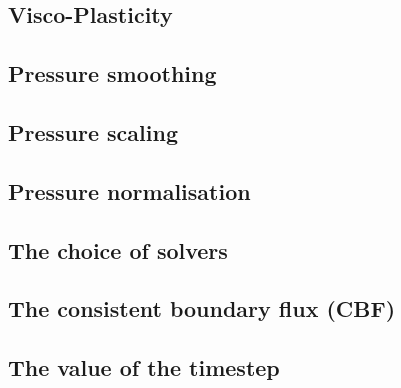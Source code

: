 \documentclass[a4paper]{article}
\begin{document}
\newpage %
\subsection{Visco-Plasticity}  %

\newpage %
\subsection{Pressure smoothing}  %

\newpage %
\subsection{Pressure scaling}  %

\newpage %
\subsection{Pressure normalisation}  %

\newpage %
\subsection{The choice of solvers\label{sec_solvers}}  %

\newpage %
\subsection{The consistent boundary flux (CBF)}  %

\newpage %
\subsection{The value of the timestep}  %

\newpage %
\end{document}
